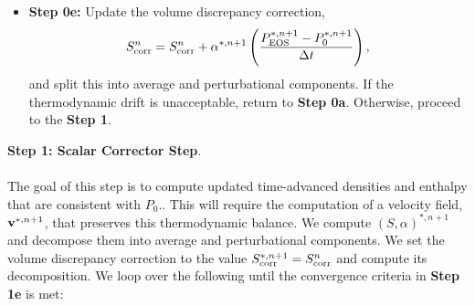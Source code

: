 \documentclass[final]{siamltex}
\def\Fb {{\bf F}}
\def\vb {{\bf v}}
\def\wb {{\bf w}}
\def\Hext {H_{\rm ext}}
\def\half   {\frac{1}{2}}
\begin{document}
\begin{itemize}
\begin{eqnarray}
\left(\frac{\rho^{*,n+1}c_p^{*,n+1,l}}{\Delta t} - \nabla\cdot\frac{1}{2}\lambda^{*,n+1,l}\nabla\right)\delta T &=& \frac{(\rho h)^n - \rho^{*,n+1}h^{*,n+1,l}}{\Delta t}\nonumber\\
&&\hspace{-1.25in} - \nabla\cdot(\rho h\vb)^n + \frac{\bar{S}^n + \bar{S}_{\rm corr}^n}{\bar{\alpha}^n}\nonumber\\
&&\hspace{-1.25in} + \half\nabla\cdot\lambda^n\nabla T^n + \half\nabla\cdot\lambda^{*,n+1,l}\nabla T^{*,n+1,l}\nonumber\\
&&\hspace{-1.25in} + \half\sum_k\nabla\cdot h_k^n \Fb_k^n + \half\sum_k\nabla\cdot h_k^{*,n+1,l} \Fb_k^{*,n+1,l},\nonumber\\
&&\hspace{-1.25in} + \half(\rho\Hext)^n + \half(\rho\Hext)^{*,n+1}.
\end{eqnarray}

{\bf Step 0d-3:} Update the temperature and enthalpy using
\begin{equation}
T^{*,n+1,l+1} = T^{*,n+1,l} + \delta T, \quad h^{*,n+1,l+1} = h(\wb^{*,n+1},T^{*,n+1,l+1}).
\end{equation}
If $l=l_{\rm max}$, set $(h,T)^{*,n+1} = (h,T)^{*,n+1,l+1}$ and proceed to {\bf Step 0e}.\\
\item {\bf Step 0e:} Update the volume discrepancy correction,
\begin{equation}
S_{\rm corr}^n = S_{\rm corr}^n + \alpha^{*,n+1}\left(\frac{P_{\rm EOS}^{*,n+1} - P_0^{*,n+1}}{\Delta t}\right),
\end{equation}
and split this into average and perturbational components.
If the thermodynamic drift is unacceptable, return to {\bf Step 0a}.
Otherwise, proceed to the {\bf Step 1}.\\
\end{itemize}
{\bf Step 1: Scalar Corrector Step}.\\ \\
The goal of this step is to compute updated time-advanced densities and enthalpy 
that are consistent with $P_0$..  This will require the computation
of a velocity field, $\vb^{*,n+1}$, that preserves this thermodynamic balance.
We compute $(S,\alpha)^{*,n+1}$ and decompose them
into average and perturbational components.
We set the volume discrepancy correction to the value
$S_{\rm corr}^{*,n+1} = S_{\rm corr}^n$ and compute its decomposition.
We loop over the following until the convergence criteria in {\bf Step 1e} is met:\\
\end{document}

